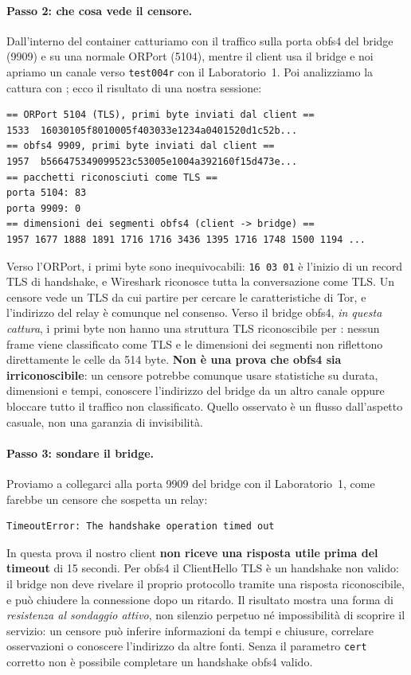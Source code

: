 \paragraph{Passo 2: che cosa vede il censore.} Dall'interno del container catturiamo con  il traffico sulla porta obfs4 del bridge (9909) e su una normale ORPort (5104), mentre il client usa il bridge e noi apriamo un canale verso \texttt{test004r} con il Laboratorio~1. Poi analizziamo la cattura con ; ecco il risultato di una nostra sessione:
\begin{lstlisting}[numbers=none]
== ORPort 5104 (TLS), primi byte inviati dal client ==
1533  16030105f8010005f403033e1234a0401520d1c52b...
== obfs4 9909, primi byte inviati dal client ==
1957  b566475349099523c53005e1004a392160f15d473e...
== pacchetti riconosciuti come TLS ==
porta 5104: 83
porta 9909: 0
== dimensioni dei segmenti obfs4 (client -> bridge) ==
1957 1677 1888 1891 1716 1716 3436 1395 1716 1748 1500 1194 ...
\end{lstlisting}
Verso l'ORPort, i primi byte sono inequivocabili: \texttt{16 03 01} è l'inizio di un record TLS di handshake, e Wireshark riconosce tutta la conversazione come TLS. Un censore vede un TLS da cui partire per cercare le caratteristiche di Tor, e l'indirizzo del relay è comunque nel consenso. Verso il bridge obfs4, \emph{in questa cattura}, i primi byte non hanno una struttura TLS riconoscibile per : nessun frame viene classificato come TLS e le dimensioni dei segmenti non riflettono direttamente le celle da 514 byte. \textbf{Non è una prova che obfs4 sia irriconoscibile}: un censore potrebbe comunque usare statistiche su durata, dimensioni e tempi, conoscere l'indirizzo del bridge da un altro canale oppure bloccare tutto il traffico non classificato. Quello osservato è un flusso dall'aspetto casuale, non una garanzia di invisibilità.

\paragraph{Passo 3: sondare il bridge.} Proviamo a collegarci alla porta 9909 del bridge con il Laboratorio~1, come farebbe un censore che sospetta un relay:
\begin{lstlisting}[numbers=none]
TimeoutError: The handshake operation timed out
\end{lstlisting}
In questa prova il nostro client \textbf{non riceve una risposta utile prima del timeout} di 15 secondi. Per obfs4 il ClientHello TLS è un handshake non valido: il bridge non deve rivelare il proprio protocollo tramite una risposta riconoscibile, e può chiudere la connessione dopo un ritardo. Il risultato mostra una forma di \emph{resistenza al sondaggio attivo}, non silenzio perpetuo né impossibilità di scoprire il servizio: un censore può inferire informazioni da tempi e chiusure, correlare osservazioni o conoscere l'indirizzo da altre fonti. Senza il parametro \texttt{cert} corretto non è possibile completare un handshake obfs4 valido.

